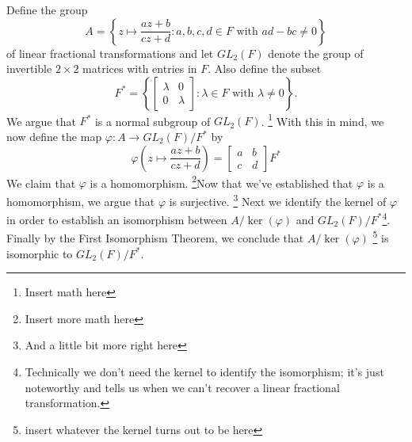 \documentclass[12pt]{article}
\newcommand{\lftmat}[4]{\begin{bmatrix} {#1} & {#2} \\ {#3} & {#4} \end{bmatrix}}
\newcommand{\stanlftmat}{\lftmat{a}{b}{c}{d}}
\theoremstyle{plain}
\theoremstyle{definition}
\begin{document}
Define the group
	\[
		A = \left\lbrace z\mapsto \frac{az + b}{cz + d}\colon a,b,c,d\in F\text{ with } ad - bc \neq 0\right\rbrace
	\]
of linear fractional transformations and let $GL_2(F)$ denote the group of invertible $2\times 2$ matrices with entries in $F$. Also define the subset
	\[
		F^* = \left\lbrace\lftmat{\lambda}{0}{0}{\lambda}\colon \lambda\in F\text{ with } \lambda\neq 0 \right\rbrace.
	\]
	We argue that $F^*$ is a normal subgroup of $GL_2(F)$. \footnote{Insert math here} With this in mind, we now define the map $\varphi\colon A\rightarrow GL_2(F)/F^*$ by
	\[
		\varphi\left(z\mapsto \frac{az + b}{cz + d}\right) = \stanlftmat F^*
	\]
	We claim that $\varphi$ is a homomorphism.  \footnote{Insert more math here}Now that we've established that $\varphi$ is a homomorphism, we argue that $\varphi$ is surjective.  \footnote{And a little bit more right here}  Next we identify the kernel of $\varphi$ in order to establish an isomorphism between $A/\ker(\varphi)$ and $GL_2(F)/F^*$\footnote{Technically we don't need the kernel to identify the isomorphism; it's just noteworthy and tells us when we can't recover a linear fractional transformation.}. Finally by the First Isomorphism Theorem, we conclude that $A/\ker(\varphi)$ \footnote{insert whatever the kernel turns out to be here} is isomorphic to $GL_2(F)/F^*$. 
	
\end{document}
